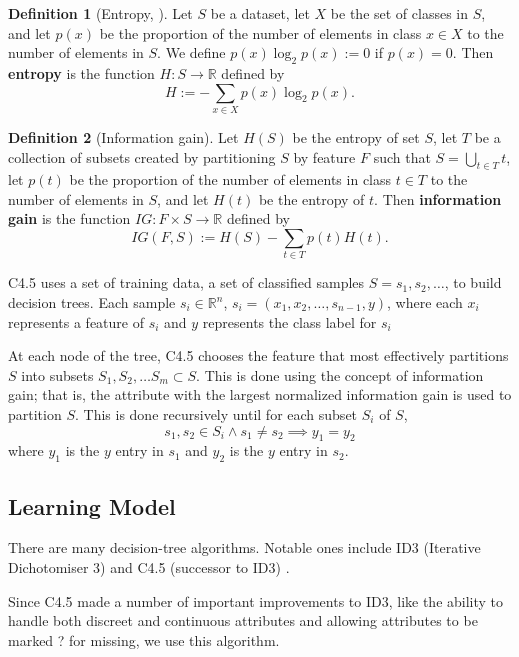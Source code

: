 \documentclass[12pt]{amsproc}
\newcommand\R{{\mathbb R}}
\theoremstyle{definition}
\newtheorem{definition}{Definition}
\begin{document}
	\begin{definition}[Entropy, \cite{shannon}]
		Let $S$ be a dataset, let $X$ be the set of classes in $S$, and let $p(x)$ be the proportion of the number of elements in class $x \in X$ to the number of elements in $S$. We define $p(x) \log_2 p(x) := 0$ if $p(x) = 0$. Then \textbf{entropy} is the function $H:S \to \R$ defined by 
		$$H := -\sum_{x \in X} p(x) \log_2 p(x).$$
	\end{definition}
	
	\begin{definition}[Information gain]
		Let $H(S)$ be the entropy of set $S$, let $T$ be a collection of subsets created by partitioning $S$ by feature $F$ such that $S = \bigcup_{t \in T}t$, let $p(t)$ be the proportion of the number of elements in class $t \in T$ to the number of elements in $S$, and let $H(t)$ be the entropy of $t$. 
		Then \textbf{information gain} is the function $IG: F \times S \to \R$ defined by 
		$$IG(F, S) := H(S) - \sum_{t \in T} p(t) H(t).$$
	\end{definition}
	
	C4.5 uses a set of training data, a set of classified samples $S = s_1,s_2,\ldots$, to build decision trees. Each sample $s_i \in \R^n$, $s_i = (x_1,x_2,\ldots,s_{n-1}, y)$, where each $x_i$ represents a feature of $s_i$ and $y$ represents the class label for $s_i$ 
	
	At each node of the tree, C4.5 chooses the feature that most effectively partitions $S$ into subsets $S_1, S_2, \ldots S_m \subset S$. This is done using the concept of information gain; that is, the attribute with the largest normalized information gain is used to partition $S$. This is done recursively until for each subset $S_i$ of $S$, $$s_1, s_2 \in S_i \wedge s_1 \neq s_2 \implies y_1 = y_2$$
	where $y_1$ is the $y$ entry in $s_1$ and $y_2$ is the $y$ entry in $s_2$.

	\subsection{Learning Model}\label{implementation:learning model}
	
	There are many decision-tree algorithms. Notable ones include ID3 (Iterative Dichotomiser 3) and C4.5 (successor to ID3) \cite{wikipedia:decision_tree}. 
	
	Since C4.5 made a number of important improvements to ID3, like the ability to handle both discreet and continuous attributes and allowing attributes to be marked ? for missing, we use this algorithm.
	
\end{document}
